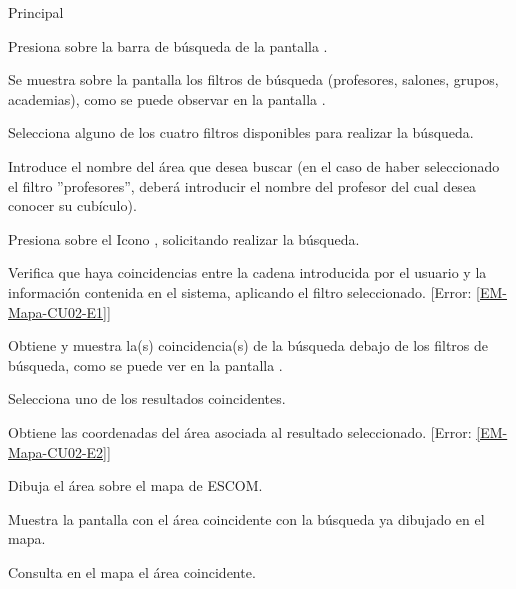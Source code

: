 \begin{UCtrayectoria}{Principal}

	\UCpaso[\UCactor] Presiona sobre la barra de búsqueda de la pantalla .

	\UCpaso Se muestra sobre la pantalla  los filtros de búsqueda (profesores,
	salones, grupos, academias), como se puede observar en la pantalla .

	\UCpaso [\UCactor] Selecciona alguno de los cuatro filtros disponibles para realizar la búsqueda. 

	\UCpaso [\UCactor] Introduce el nombre del área que desea buscar (en el caso de haber seleccionado el filtro ''profesores'',
	deberá introducir el nombre del profesor del cual desea conocer su cubículo).

	\UCpaso [\UCactor] Presiona sobre el Icono , solicitando realizar la búsqueda. 

	\UCpaso Verifica que haya coincidencias entre la cadena introducida por el usuario y la información contenida en el sistema,
	aplicando el filtro seleccionado. [Error: \ref{EM-Mapa-CU02-E1}]

	\UCpaso Obtiene y muestra la(s) coincidencia(s) de la búsqueda debajo de los filtros de búsqueda, como se puede ver en la
	pantalla .

	\UCpaso [\UCactor] Selecciona uno de los resultados coincidentes. 

	\UCpaso Obtiene las coordenadas del área asociada al resultado seleccionado. [Error: \ref{EM-Mapa-CU02-E2}]

	\UCpaso Dibuja el área sobre el mapa de ESCOM. 

	\UCpaso Muestra la pantalla  con el área coincidente con la búsqueda
	ya dibujado en el mapa. 

	\UCpaso [\UCactor] Consulta en el mapa el área coincidente. 


\end{UCtrayectoria}


